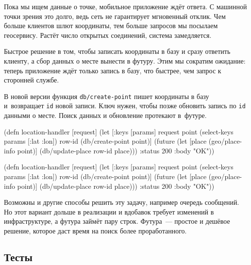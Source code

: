 Пока мы ищем данные о точке, мобильное приложение ждёт ответа. С машинной точки
зрения это долго, ведь сеть не гарантирует мгновенный отклик. Чем больше
клиентов шлют координаты, тем больше запросов мы посылаем геосервису. Растёт
число открытых соединений, система замедляется.


Быстрое решение в том, чтобы записать координаты в базу и сразу ответить
клиенту, а сбор данных о месте вынести в футуру. Этим мы сократим ожидание:
теперь приложение ждёт только запись в базу, что быстрее, чем запрос к сторонней
службе.

В новой версии функция \verb|db/create-point| пишет координаты в базу
и~возвращает \verb|id| новой записи. Ключ нужен, чтобы позже обновить запись по
\verb|id| данными о месте. Поиск данных и обновление протекают в~футуре.

\ifnarrow

\begin{english}
  \begin{clojure}
(defn location-handler
  [request]
  (let [{:keys [params]} request
        point (select-keys params
                [:lat :lon])
        row-id (db/create-point point)]
    (future
      (let [place (geo/place-info
                    point)]
        (db/update-place row-id place)))
    {:status 200 :body "OK"}))
  \end{clojure}
\end{english}

\else

\begin{english}
  \begin{clojure}
(defn location-handler
  [request]
  (let [{:keys [params]} request
        point (select-keys params [:lat :lon])
        row-id (db/create-point point)]
    (future
      (let [place (geo/place-info point)]
        (db/update-place row-id place)))
    {:status 200 :body "OK"}))
  \end{clojure}
\end{english}

\fi

Возможны и другие способы решить эту задачу, например очередь сообщений. Но этот
вариант дольше в реализации и вдобавок требует изменений в инфраструктуре, а
футура займёт пару строк. Футура~--- простое и дешёвое решение, которое даст
время на поиск более проработанного.

\subsection{Тесты}

